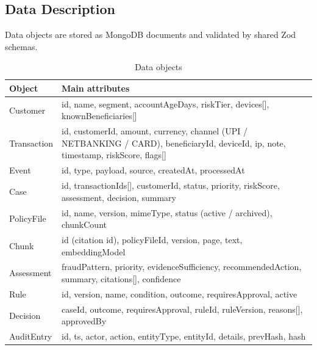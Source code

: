 \documentclass[oneside,a4paper,12pt]{report}
\begin{document}
\subsection{Data Description}
Data objects are stored as MongoDB documents and validated by shared Zod schemas.
\begin{table}[H]
\centering\small
\begin{tabularx}{\textwidth}{|l|X|}
\hline
\textbf{Object} & \textbf{Main attributes} \\ \hline
Customer & id, name, segment, accountAgeDays, riskTier, devices[], knownBeneficiaries[] \\ \hline
Transaction & id, customerId, amount, currency, channel (UPI / NETBANKING / CARD), beneficiaryId, deviceId, ip, note, timestamp, riskScore, flags[] \\ \hline
Event & id, type, payload, source, createdAt, processedAt \\ \hline
Case & id, transactionIds[], customerId, status, priority, riskScore, assessment, decision, summary \\ \hline
PolicyFile & id, name, version, mimeType, status (active / archived), chunkCount \\ \hline
Chunk & id (citation id), policyFileId, version, page, text, embeddingModel \\ \hline
Assessment & fraudPattern, priority, evidenceSufficiency, recommendedAction, summary, citations[], confidence \\ \hline
Rule & id, version, name, condition, outcome, requiresApproval, active \\ \hline
Decision & caseId, outcome, requiresApproval, ruleId, ruleVersion, reasons[], approvedBy \\ \hline
AuditEntry & id, ts, actor, action, entityType, entityId, details, prevHash, hash \\ \hline
\end{tabularx}
\caption{Data objects}
\end{table}
\end{document}
